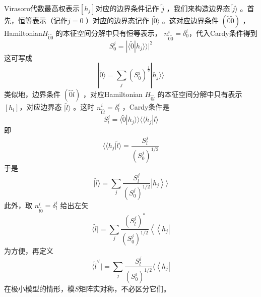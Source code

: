 Virasoro代数最高权表示$ [h_j] $对应的边界条件记作 $\tilde{j}$ ，我们来构造边界态$ |\tilde{j}\rangle$ 。首先，恒等表示（记作$ j=0$ ）对应的边界态记作 $|\tilde{0}\rangle$ 。这对应边界条件 $(\tilde{0}\tilde{0})$ ，Hamiltonian$ H_{\tilde{0} \tilde{0}}$ 的本征空间分解中只有恒等表示， $n_{\tilde{0} \tilde{0}}^{i}=\delta_{0}^{i} $，代入Cardy条件得到
\begin{equation}
	S_{0}^{j}= | \langle\tilde{0} |h_{j} \rangle \rangle |^{2}
\end{equation} 
这可写成
\begin{equation}
	|\tilde{0}\rangle=\sum_{j}\left(S_{0}^{j}\right)^{\frac{1}{2}} |h_{j} \rangle \rangle
\end{equation}
类似地，边界条件 $(\tilde{0}\tilde{l})$ ，对应Hamiltonian $H_{\tilde{0} \tilde{l}}$ 的本征空间分解中只有表示 $[h_l] $，对应边界态 $|\tilde{l}\rangle$ 。这时 $n_{\tilde{0} \tilde{l}}^{i}=\delta_{l}^{i}$ ，Cardy条件是
\begin{equation}
	S_l^j=\langle \tilde{0}|h_j\rangle\rangle\langle\langle h_j|l\rangle
\end{equation}
即
\begin{equation}
	\langle \langle h_{j} | \tilde{l} \rangle=\frac{S_{l}^{j}}{\left(S_{0}^{j}\right)^{1 / 2}} 
\end{equation}
于是
\begin{equation}
	|\tilde{l}\rangle=\sum_{j} \frac{S_{l}^{j}}{\left(S_{0}^{j}\right)^{1 / 2}}\left|h_{j}\right\rangle \rangle
\end{equation}
此外，取 $n_{\tilde{l} \tilde{0}}^{i}=\delta_{l}^{i}$ 给出左矢
\begin{equation}
	\langle\tilde{l}|=\sum_{j} \frac{\left(S_{l}^{j}\right)^{*}}{\left(S_{0}^{j}\right)^{1 / 2}}\left\langle\left\langle h_{j}\right|\right. 
\end{equation}
为方便，再定义
\begin{equation}
	\langle\tilde{l}^{\vee} |=\sum_{j} \frac{S_{l}^{j}}{\left(S_{0}^{j}\right)^{1 / 2}} \langle\left\langle h_{j}\right| 
\end{equation}
在极小模型的情形，模$ S $矩阵实对称，不必区分它们。

